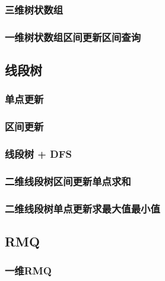 \documentclass[a4paper, 12pt, twoside]{article}
\begin{document}
\subsubsection{三维树状数组}

\subsubsection{一维树状数组区间更新区间查询}


\subsection{线段树}
\subsubsection{单点更新}

\subsubsection{区间更新}

\subsubsection{线段树 + DFS}

\subsubsection{二维线段树区间更新单点求和}

\subsubsection{二维线段树单点更新求最大值最小值}


\subsection{RMQ}
\subsubsection{一维RMQ}

\end{document}
